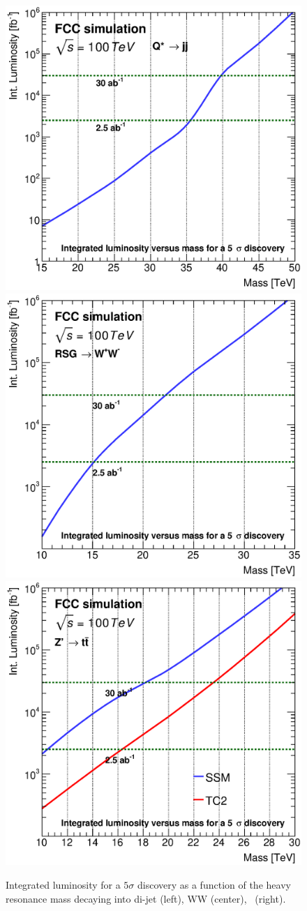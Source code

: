 \begin{figure}[!htb]
  \centering
  \includegraphics[width=0.30\columnwidth]{Fig/DiscoveryPotential_jj_rootStyle.eps}
  \includegraphics[width=0.30\columnwidth]{Fig/DiscoveryPotential_ww_tagger_rootStyle.eps}
  \includegraphics[width=0.30\columnwidth]{Fig/DiscoveryPotential_tt_SSM_TC2_tagger_TRFbtag_rootStyle.eps}
  \caption{Integrated luminosity for a $5\sigma$ discovery as a function of the heavy resonance mass decaying into di-jet (left), WW (center), \ttbar\ (right).}
  \label{figure:hadronicresonances:resultsjj}
\end{figure}

\clearpage
\newpage
